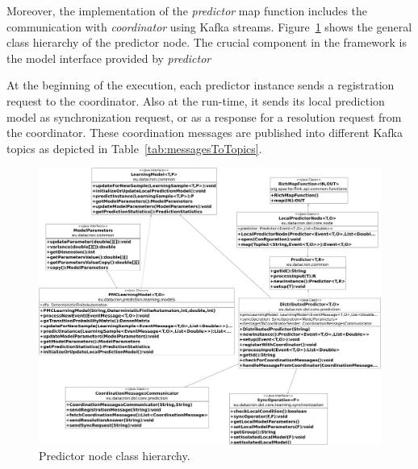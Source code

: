 \par Moreover, the implementation of the \textit{predictor} map function includes the communication  with \textit{coordinator} using Kafka streams.
Figure~\ref{fig:class_diagram} shows the general class hierarchy of the predictor node. The	crucial	component in the framework is the model interface provided by \textit{predictor}

 At the beginning of the execution,  each predictor instance sends a registration request to the coordinator. Also at the run-time,  it sends  its local prediction model as synchronization request,  or as a response for a resolution request from the coordinator. These coordination messages are published into different Kafka topics as depicted in Table~\ref{tab:messagesToTopics}. 
 
 
 \begin{figure}[H]
 	\centering
 	\includegraphics[width=\textwidth,height=\linewidth]{chapters/figures/predictor_diagram.png}
 	
 	\caption{Predictor node class hierarchy.}
 	\label{fig:class_diagram}
 \end{figure}

